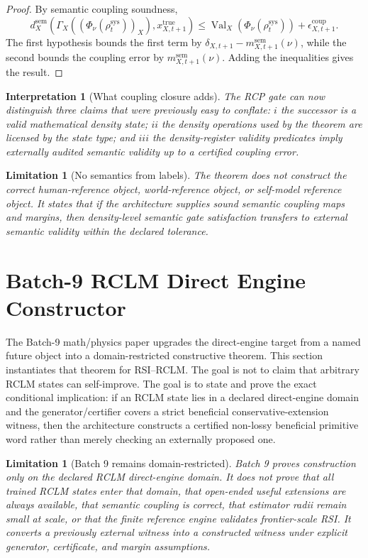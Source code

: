 \documentclass[11pt,a4paper]{article}
\newtheorem{limitation}[theorem]{Limitation}
\newtheorem{interpretation}[theorem]{Interpretation}
\newcommand{\sem}{\mathrm{sem}}
\newcommand{\sys}{\mathrm{sys}}
\newcommand{\true}{\mathrm{true}}
\newcommand{\Val}{\operatorname{Val}}
\newcommand{\coup}{\mathrm{coup}}
\begin{document}
\begin{proof}
By semantic coupling soundness,
\[
d_X^{\sem}(\Gamma_X((\Phi_\nu(\rho_t^{\sys}))_X),x_{X,t+1}^{\true})
\le
\Val_X(\Phi_\nu(\rho_t^{\sys}))+\epsilon_{X,t+1}^{\coup}.
\]
The first hypothesis bounds the first term by \(\delta_{X,t+1}-m_{X,t+1}^{\sem}(\nu)\), while the second bounds the coupling error by \(m_{X,t+1}^{\sem}(\nu)\). Adding the inequalities gives the result.
\end{proof}

\begin{interpretation}[What coupling closure adds]
The RCP gate can now distinguish three claims that were previously easy to conflate: \(i\) the successor is a valid mathematical density state; \(ii\) the density operations used by the theorem are licensed by the state type; and \(iii\) the density-register validity predicates imply externally audited semantic validity up to a certified coupling error.
\end{interpretation}

\begin{limitation}[No semantics from labels]
The theorem does not construct the correct human-reference object, world-reference object, or self-model reference object. It states that if the architecture supplies sound semantic coupling maps and margins, then density-level semantic gate satisfaction transfers to external semantic validity within the declared tolerance.
\end{limitation}

\section{Batch-9 RCLM Direct Engine Constructor}
\label{sec:batch9-rclm-direct-engine-constructor}

The Batch-9 math/physics paper upgrades the direct-engine target from a named future object into a domain-restricted constructive theorem. This section instantiates that theorem for RSI--RCLM. The goal is not to claim that arbitrary RCLM states can self-improve. The goal is to state and prove the exact conditional implication: if an RCLM state lies in a declared direct-engine domain and the generator/certifier covers a strict beneficial conservative-extension witness, then the architecture constructs a certified non-lossy beneficial primitive word rather than merely checking an externally proposed one.

\begin{limitation}[Batch 9 remains domain-restricted]
Batch 9 proves construction only on the declared RCLM direct-engine domain. It does not prove that all trained RCLM states enter that domain, that open-ended useful extensions are always available, that semantic coupling is correct, that estimator radii remain small at scale, or that the finite reference engine validates frontier-scale RSI. It converts a previously external witness into a constructed witness under explicit generator, certificate, and margin assumptions.
\end{limitation}
\end{document}
